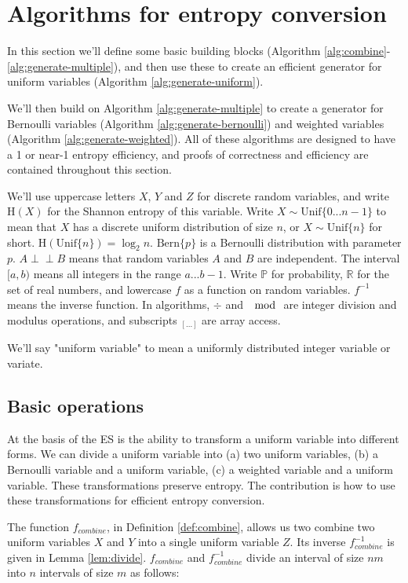 \documentclass[lettersize,onecolumn]{IEEEtran}
\newcommand{\indep}{\perp\!\!\!\perp}
\newcommand{\unif}[1]{\mathrm{Unif}\{#1\}}
\newcommand{\bern}[1]{\mathrm{Bern}\{#1\}}
\newcommand{\entropy}[1]{\mathrm{H}(#1)}
\begin{document}
\section{Algorithms for entropy conversion}

In this section we'll define some basic building blocks (Algorithm \ref{alg:combine}-\ref{alg:generate-multiple}), and then use these to create an efficient generator for uniform variables (Algorithm \ref{alg:generate-uniform}).

We'll then build on Algorithm \ref{alg:generate-multiple} to create a generator for Bernoulli variables (Algorithm \ref{alg:generate-bernoulli}) and weighted variables (Algorithm \ref{alg:generate-weighted}). All of these algorithms are designed to have a 1 or near-1 entropy efficiency, and proofs of correctness and efficiency are contained throughout this section.

We'll use uppercase letters $X$, $Y$ and $Z$ for discrete random variables, and write $\entropy{X}$ for the Shannon entropy of this variable. Write $X \sim \unif{0 ... n-1}$ to mean that $X$ has a discrete uniform distribution of size $n$, or $X \sim \unif{n}$ for short. $\entropy{\unif{n}} = \log_2n$. $\bern{p}$ is a Bernoulli distribution with parameter $p$. $A \indep B$ means that random variables $A$ and $B$ are independent.  The interval $[a,b)$ means all integers in the range $a...b-1$. Write $\mathbb{P}$ for probability, $\mathbb{R}$ for the set of real numbers, and lowercase $f$ as a function on random variables. $f^{-1}$ means the inverse function. In algorithms, $\div$ and $\mod$ are integer division and modulus operations, and subscripts $_{[...]}$ are array access.

We'll say "uniform variable" to mean a uniformly distributed integer variable or variate.


\subsection{Basic operations}

At the basis of the ES is the ability to transform a uniform variable into different forms.  We can divide a uniform variable into (a) two uniform variables, (b) a Bernoulli variable and a uniform variable, (c) a weighted variable and a uniform variable. These transformations preserve entropy. The contribution is how to use these transformations for efficient entropy conversion.

The function $f_{combine}$, in Definition \ref{def:combine}, allows us two combine two uniform variables $X$ and $Y$ into a single uniform variable $Z$. Its inverse $f^{-1}_{combine}$ is given in Lemma \ref{lem:divide}. $f_{combine}$ and $f^{-1}_{combine}$ divide an interval of size $nm$ into $n$ intervals of size $m$ as follows:
\end{document}
